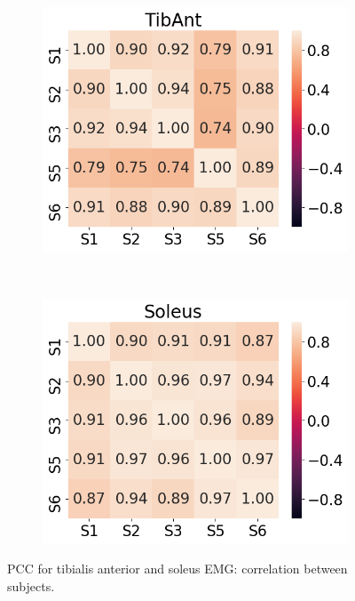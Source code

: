 \begin{figure}[!htb]
     \centering
     \begin{subfigure}[b]{0.45\textwidth}
         \centering
         \includegraphics[width=\textwidth]{img/results/correlations/TibAnt_correlation_between_subjects.png}
     \end{subfigure}
     ~
     \begin{subfigure}[b]{0.45\textwidth}
         \centering
         \includegraphics[width=\textwidth]{img/results/correlations/Soleus_correlation_between_subjects.png}
     \end{subfigure}
    \caption{\ac{PCC} for tibialis anterior and soleus \ac{EMG}: correlation between subjects.}
    \label{fig:A-tibant-and-soleus-correlation}
\end{figure}
